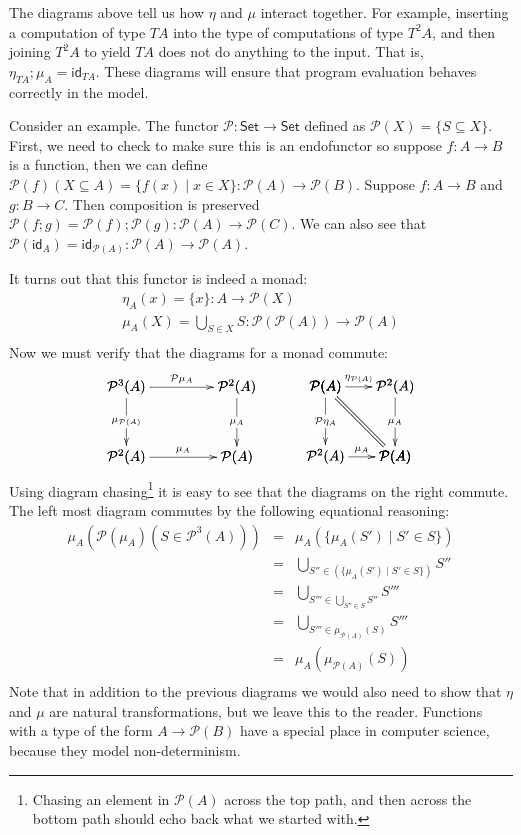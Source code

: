 \documentclass{article}
\let\mto\to
\let\to\relax
\newcommand{\to}{\rightarrow}
\newcommand{\id}[0]{\mathsf{id}}
\begin{document}
The diagrams above tell us how $\eta$ and $\mu$ interact together.
For example, inserting a computation of type $TA$ into the type of
computations of type $T^2A$, and then joining $T^2A$ to yield $TA$
does not do anything to the input.  That is, $\eta_{TA};\mu_A =
\id_{TA}$.  These diagrams will ensure that program evaluation behaves
correctly in the model.

Consider an example.  The functor $\mathcal{P} : \mathsf{Set} \mto
\mathsf{Set}$ defined as $\mathcal{P}(X) = \{S \subseteq X\}$.  First,
we need to check to make sure this is an endofunctor so suppose $f : A
\mto B$ is a function, then we can define $\mathcal{P}(f)(X \subseteq
A) = \{f(x) \mid x \in X \} : \mathcal{P}(A) \mto
\mathcal{P}(B)$. Suppose $f : A \mto B$ and $g : B \mto C$.  Then
composition is preserved $\mathcal{P}(f;g) =
\mathcal{P}(f);\mathcal{P}(g) : \mathcal{P}(A) \mto \mathcal{P}(C)$.  We
can also see that $\mathcal{P}(\id_A) =
\id_{\mathcal{P}(A)} : \mathcal{P}(A) \mto \mathcal{P}(A)$.

It turns out that this functor is indeed a monad:
\[
\begin{array}{lll}
  \eta_A(x) = \{x\} : A \mto \mathcal{P}(X)\\
  \mu_A(X) = \bigcup_{S \in X}S : \mathcal{P}(\mathcal{P}(A)) \mto \mathcal{P}(A)\\
\end{array}
\]
Now we must verify that the diagrams for a monad commute:
\[
\begin{array}{ccc}
  \bfig
  \Square|amma|[
    \mathcal{P}^3 (A)`
    \mathcal{P}^2(A)`
    \mathcal{P}^2(A)`
    \mathcal{P}(A);
    \mathcal{P}\mu_A`
    \mu_{\mathcal{P}(A)}`
    \mu_A`
    \mu_A]
  \efig
  & \quad &
  \bfig
  \qtriangle|amm|/->`=`->/[
    \mathcal{P}(A)`
    \mathcal{P}^2(A)`
    \mathcal{P}(A);
    \eta_{\mathcal{P}(A)}``
    \mu_A]
  \btriangle|mma|/->`=`->/[
    \mathcal{P}(A)`
    \mathcal{P}^2(A)`
    \mathcal{P}(A);
    \mathcal{P}\eta_A``
    \mu_A]
  \efig
\end{array}
\]
Using diagram chasing\footnote{Chasing an element in $\mathcal{P}(A)$
  across the top path, and then across the bottom path should echo
  back what we started with.} it is easy to see that the diagrams on
the right commute.  The left most diagram commutes by the following
equational reasoning:
\[
\begin{array}{lll}
  \mu_{A}(\mathcal{P}(\mu_A)(S \in \mathcal{P}^3(A)))
  & = & \mu_{A}(\{\mu_A(S') \mid S' \in S\})\\
  & = & \bigcup_{S'' \in (\{\mu_A(S') \mid S' \in S\})} S''\\
  & = & \bigcup_{S''' \in \bigcup_{S'' \in S} S''}S'''\\
  & = & \bigcup_{S''' \in \mu_{\mathcal{P}(A)}(S)}S'''\\
  & = & \mu_{A}(\mu_{\mathcal{P}(A)}(S))\\
\end{array}
\]
Note that in addition to the previous diagrams we would also need to
show that $\eta$ and $\mu$ are natural transformations, but we leave
this to the reader. Functions with a type of the form $A \mto
\mathcal{P}(B)$ have a special place in computer science, because they
model non-determinism.
\end{document}
